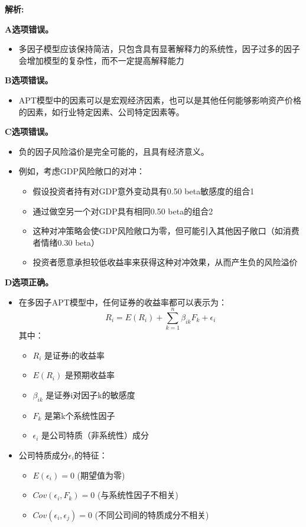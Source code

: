 \documentclass{article}
\newenvironment{explanation}
{\textbf{解析:}\par}
{\par}
\begin{document}
\begin{explanation}
    \textbf{A选项错误。}
    \begin{itemize}
        \item 多因子模型应该保持简洁，只包含具有显著解释力的系统性，因子过多的因子会增加模型的复杂性，而不一定提高解释能力
    \end{itemize}
    
    \textbf{B选项错误。}
    \begin{itemize}
        \item APT模型中的因素可以是宏观经济因素，也可以是其他任何能够影响资产价格的因素，如行业特定因素、公司特定因素等。
    \end{itemize}
    
    \textbf{C选项错误。}
    \begin{itemize}
        \item 负的因子风险溢价是完全可能的，且具有经济意义。
        \item 例如，考虑GDP风险敞口的对冲：
            \begin{itemize}
                \item 假设投资者持有对GDP意外变动具有0.50 beta敏感度的组合1
                \item 通过做空另一个对GDP具有相同0.50 beta的组合2
                \item 这种对冲策略会使GDP风险敞口为零，但可能引入其他因子敞口（如消费者情绪0.30 beta）
                \item 投资者愿意承担较低收益率来获得这种对冲效果，从而产生负的风险溢价
            \end{itemize}
    \end{itemize}
    
    \textbf{D选项正确。}
    \begin{itemize}
        \item 在多因子APT模型中，任何证券的收益率都可以表示为：
        \[
        R_i = E(R_i) + \sum_{k=1}^n \beta_{ik}F_k + \epsilon_i
        \]
        其中：
        \begin{itemize}
            \item $R_i$ 是证券i的收益率
            \item $E(R_i)$ 是预期收益率
            \item $\beta_{ik}$ 是证券i对因子k的敏感度
            \item $F_k$ 是第k个系统性因子
            \item $\epsilon_i$ 是公司特质（非系统性）成分
        \end{itemize}
        \item 公司特质成分$\epsilon_i$的特征：
            \begin{itemize}
                \item $E(\epsilon_i) = 0$ (期望值为零)
                \item $Cov(\epsilon_i, F_k) = 0$ (与系统性因子不相关)
                \item $Cov(\epsilon_i, \epsilon_j) = 0$ (不同公司间的特质成分不相关)
            \end{itemize}
    \end{itemize}
\end{explanation}
\end{document}
